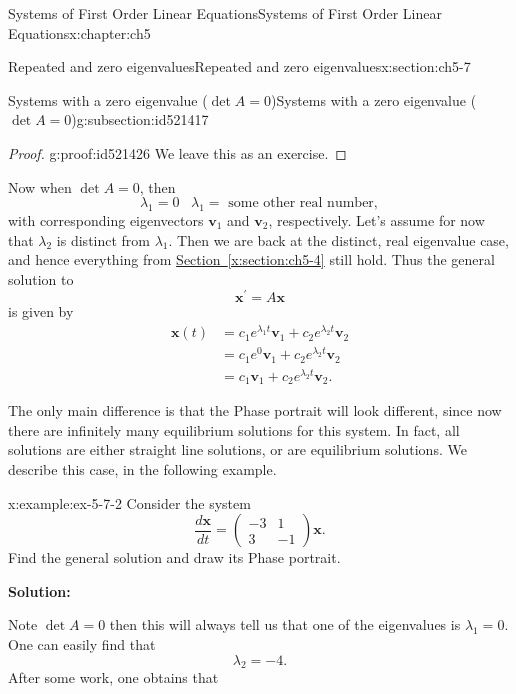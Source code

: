 \documentclass[oneside,10pt,]{book}
\newcommand{\xreffont}{\relax}
\newcommand{\terminology}[1]{\textbf{#1}}
\numberwithin{equation}{section}
\numberwithin{equation}{section}
\newcommand{\amp}{&}
\begin{document}
\begin{chapterptx}{Systems of First Order Linear Equations}{}{Systems of First Order Linear Equations}{}{}{x:chapter:ch5}
\begin{sectionptx}{Repeated and zero eigenvalues}{}{Repeated and zero eigenvalues}{}{}{x:section:ch5-7}
\begin{subsectionptx}{Systems with a zero eigenvalue (\(\det A=0 \))}{}{Systems with a zero eigenvalue (\(\det A=0 \))}{}{}{g:subsection:id521417}
\begin{proof}{}{g:proof:id521426}
We leave this as an exercise.%
\end{proof}
Now when \(\det A=0\), then%
\begin{equation*}
\lambda_{1}=0\,\,\,\,\,\lambda_{1}=\text{ some other real number},
\end{equation*}
with corresponding eigenvectors \(\mathbf{v}_{1}\) and \(\mathbf{v}_{2}\), respectively. Let's assume for now that \(\lambda_{2}\) is distinct from \(\lambda_{1}\). Then we are back at the distinct, real eigenvalue case, and hence everything from \hyperref[x:section:ch5-4]{Section~{\xreffont\ref{x:section:ch5-4}}} still hold. Thus the general solution to%
\begin{equation*}
\mathbf{x}^{\prime}=A\mathbf{x}
\end{equation*}
is given by%
\begin{align*}
\mathbf{x}(t) \amp =c_{1}e^{\lambda_{1}t}\mathbf{v}_{1}+c_{2}e^{\lambda_{2}t}\mathbf{v}_{2}\\
\amp =c_{1}e^{0}\mathbf{v}_{1}+c_{2}e^{\lambda_{2}t}\mathbf{v}_{2}\\
\amp =c_{1}\mathbf{v}_{1}+c_{2}e^{\lambda_{2}t}\mathbf{v}_{2}.
\end{align*}
%
\par
The only main difference is that the Phase portrait will look different, since now there are infinitely many equilibrium solutions for this system. In fact, all solutions are either straight line solutions, or are equilibrium solutions. We describe this case, in the following example.%
\begin{example}{}{x:example:ex-5-7-2}%
Consider the system%
\begin{equation*}
\frac{d\mathbf{x}}{dt}=\left(\begin{array}{cc}
-3 \amp 1\\
3 \amp -1
\end{array}\right)\mathbf{x}.
\end{equation*}
Find the general solution and draw its Phase portrait.%
\par
\terminology{Solution:}%
\par
Note \(\det A=0\) then this will always tell us that one of the eigenvalues is \(\lambda_{1}=0\). One can easily find that%
\begin{equation*}
\lambda_{2}=-4.
\end{equation*}
After some work,  one obtains that%
\end{example}
\end{subsectionptx}
\end{sectionptx}
\end{chapterptx}
\end{document}
